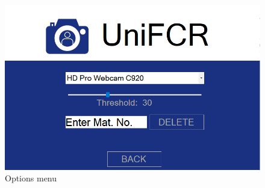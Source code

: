 \documentclass[12pt, a4paper]{article}
\begin{document}
\begin{figure}[h!]
\begin{center}
	\centering
		\includegraphics[width=1.0\columnwidth]{images/options}
	\caption{Options menu}
	\label{fig:options}
\end{center}
\end{figure}
\end{document}

